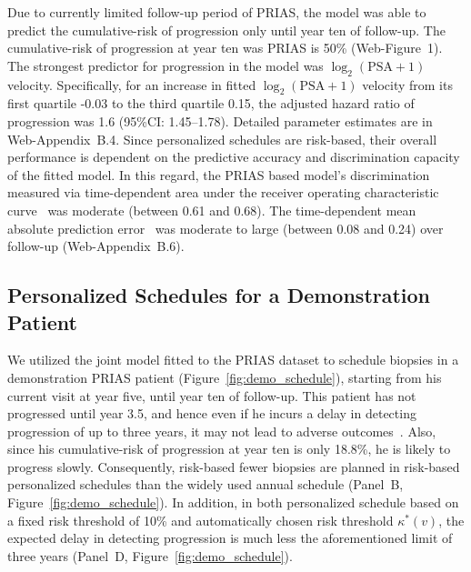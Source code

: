 Due to currently limited follow-up period of PRIAS, the model was able to predict the cumulative-risk of progression only until year ten of follow-up. The cumulative-risk of progression at year ten was PRIAS is 50\% (Web-Figure~1). The strongest predictor for progression in the model was $\log_2(\mbox{PSA} + 1)$ velocity. Specifically, for an increase in fitted $\log_2(\mbox{PSA} + 1)$ velocity from its first quartile -0.03 to the third quartile 0.15, the adjusted hazard ratio of progression was 1.6 (95\%CI: 1.45--1.78). Detailed parameter estimates are in Web-Appendix~B.4. Since personalized schedules are risk-based, their overall performance is dependent on the predictive accuracy and discrimination capacity of the fitted model. In this regard, the PRIAS based model's discrimination measured via time-dependent area under the receiver operating characteristic curve~\citep{rizopoulos2011dynamic} was moderate (between 0.61 and 0.68). The time-dependent mean absolute prediction error~\citep{rizopoulos2011dynamic} was moderate to large (between 0.08 and 0.24) over follow-up (Web-Appendix~B.6).

\subsection{Personalized Schedules for a Demonstration Patient}
We utilized the joint model fitted to the PRIAS dataset to schedule biopsies in a demonstration PRIAS patient (Figure~\ref{fig:demo_schedule}), starting from his current visit at year five, until year ten of follow-up. This patient has not progressed until year 3.5, and hence even if he incurs a delay in detecting progression of up to three years, it may not lead to adverse outcomes~\citep{carvalho}. Also, since his cumulative-risk of progression at year ten is only 18.8\%, he is likely to progress slowly. Consequently, risk-based fewer biopsies are planned in risk-based personalized schedules than the widely used annual schedule (Panel~B, Figure~\ref{fig:demo_schedule}). In addition, in both personalized schedule based on a fixed risk threshold of 10\% and automatically chosen risk threshold $\kappa^*(v)$, the expected delay in detecting progression is much less the aforementioned limit of three years (Panel~D, Figure~\ref{fig:demo_schedule}).

